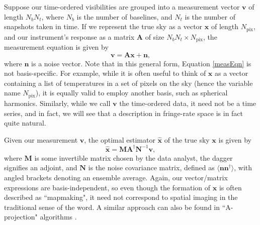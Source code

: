 \documentclass[twocolumn,apj,numberedappendix]{emulateapj}
\newcommand{\vis}{\mathbf{v}}
\newcommand{\x}{\mathbf{x}}
\newcommand{\xhat}{\hat{\mathbf{x}}}
\newcommand{\A}{\mathbf{A}}
\newcommand{\N}{\mathbf{N}}
\begin{document}
Suppose our time-ordered visibilities are grouped into a measurement vector
$\vis$ of length $N_b N_t$, where $N_b$ is the number of baselines, and $N_t$
is the number of snapshots taken in time.  If we represent the true sky as a
vector $\x$ of length $N_\textrm{pix}$, and our instrument's response as a
matrix $\A$ of size $N_b N_t \times N_\textrm{pix}$, the measurement equation
is given by
\begin{equation}
\label{measEqn}
\vis = \A \x + \mathbf{n},
\end{equation}
where $\mathbf{n}$ is a noise vector.  Note that in this general form, Equation
\eqref{measEqn} is not basis-specific.  For example, while it is often useful
to think of $\x$ as a vector containing a list of temperatures in a set of
pixels on the sky (hence the variable name $N_\textrm{pix}$), it is equally
valid to employ another basis, such as spherical harmonics.  Similarly, while
we call $\vis$ the time-ordered data, it need not be a time series, and in
fact, we will see that a description in fringe-rate space is in fact quite natural.

Given our measurement $\vis$, the optimal estimator $\xhat$ of the true sky
$\x$ is given by \citep{T97mapmaking,Morales2009,dillon_et_al2015}
\begin{equation}
\label{optEst}
\xhat = \mathbf{M} \A^\dagger \N^{-1} \vis,
\end{equation}
where $\mathbf{M}$ is some invertible matrix chosen by the data analyst, 
the dagger signifies an adjoint, and
$\N$ is the noise covariance matrix, defined as $\langle \mathbf{n}
\mathbf{n}^\dagger \rangle$, with angled brackets denoting an ensemble average.
Again, our vector/matrix expressions are basis-independent, so even though the
formation of $\xhat$ is often described as ``mapmaking", it need not correspond
to spatial imaging in the traditional sense of the word. A similar approach
can also be found in ``A-projection" algorithms \citep{bhatnagar_et_al2008,
bhatnagar_et_al2013,tasse_et_al2013}.
\end{document}
